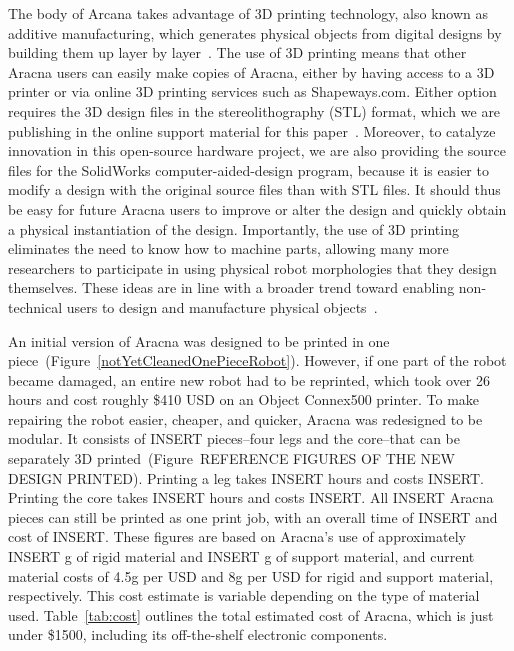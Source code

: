 \documentclass[letterpaper]{article}
\begin{document}
The body of Arcana takes advantage of 3D printing technology, also known as additive manufacturing, which generates physical objects from digital designs by building them up layer by layer~\citep{gibson2009additive, lipson2010factory}. The use of 3D printing means that other Aracna users can easily make copies of Aracna, either by having access to a 3D printer or via online 3D printing services such as Shapeways.com. Either option requires the 3D design files in the stereolithography (STL) format, which we are publishing in the online support material for this paper~\citep{WEB}. Moreover, to catalyze innovation in this open-source hardware project, we are also providing the source files for the SolidWorks computer-aided-design program, because it is easier to modify a design with the original source files than with STL files. It should thus be easy for future Aracna users to improve or alter the design and quickly obtain a physical instantiation of the design. Importantly, the use of 3D printing eliminates the need to know how to machine parts, allowing many more researchers to participate in using physical robot morphologies that they design themselves. These ideas are in line with a broader trend toward enabling non-technical users to design and manufacture physical objects~\citep{clune2011objects, clune2011endless, lipson2010factory}.

An initial version of Aracna was designed to be printed in one piece~(Figure~\ref{notYetCleanedOnePieceRobot}). However, if one part of the robot became damaged, an entire new robot had to be reprinted, which took over 26 hours and cost roughly \$410 USD on an Object Connex500 printer. To make repairing the robot easier, cheaper, and quicker, Aracna was redesigned to be modular. It consists of INSERT pieces--four legs and the core--that can be separately 3D printed~(Figure~REFERENCE FIGURES OF THE NEW DESIGN PRINTED). Printing a leg takes INSERT hours and costs INSERT. Printing the core takes INSERT hours and costs INSERT. All INSERT Aracna pieces can still be printed as one print job, with an overall time of INSERT and cost of INSERT. These figures are based on Aracna's use of  approximately INSERT g of rigid material and INSERT g of support
material, and current material costs of 4.5g per USD and 8g per USD for rigid and support material, respectively. This cost estimate is variable depending on
the type of material used. Table~\ref{tab:cost} outlines the total estimated cost of Aracna, which is just under \$1500, including its off-the-shelf electronic components. 
\end{document}
